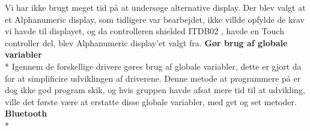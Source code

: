 Vi har ikke brugt meget tid på at undersøge alternative display. Der blev valgt at et Alphanumeric display, som tidligere var bearbejdet, ikke villde opfylde de krav vi havde til displayet, og da controlleren shielded ITDB02 
, havde en Touch controller del, blev Alphanumeric display'et valgt fra.
\newline
\newline
\textbf{Gør brug af globale variabler} \\*
Igennem de forskellige drivere gøres brug af globale variabler, dette er gjort da for at simplificire udviklingen af driverene. Denne metode at programmere på er dog ikke god program skik, og hvis gruppen havde afsat mere tid til at udvikling, ville det første være at erstatte disse globale variabler, med get og set metoder. 
\newline
\newline
\textbf{Bluetooth} \\*
  
